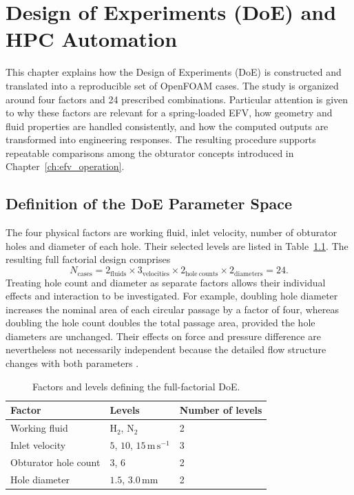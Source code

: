 \chapter{Design of Experiments (DoE) and HPC Automation}
\label{ch:doe}

This chapter explains how the Design of Experiments (DoE) is constructed and translated into a reproducible set of OpenFOAM cases. The study is organized around four factors and 24 prescribed combinations. Particular attention is given to why these factors are relevant for a spring-loaded EFV, how geometry and fluid properties are handled consistently, and how the computed outputs are transformed into engineering responses. The resulting procedure supports repeatable comparisons among the obturator concepts introduced in Chapter~\ref{ch:efv_operation}.

\section{Definition of the DoE Parameter Space}
\label{sec:doe_parameters}

The four physical factors are working fluid, inlet velocity, number of obturator holes and diameter of each hole. Their selected levels are listed in Table~\ref{tab:doe_factors}. The resulting full factorial design comprises
\begin{equation}
    N_{\mathrm{cases}}=2_{\mathrm{fluids}}\times3_{\mathrm{velocities}}\times
    2_{\mathrm{hole\ counts}}\times2_{\mathrm{diameters}}=24.
    \label{eq:doe_cases}
\end{equation}
Treating hole count and diameter as separate factors allows their individual effects and interaction to be investigated. For example, doubling hole diameter increases the nominal area of each circular passage by a factor of four, whereas doubling the hole count doubles the total passage area, provided the hole diameters are unchanged. Their effects on force and pressure difference are nevertheless not necessarily independent because the detailed flow structure changes with both parameters \cite{white2016,crane410}.

\begin{table}[htbp]
\centering
\begin{tabular}{@{}lll@{}}
\toprule
\textbf{Factor} & \textbf{Levels} & \textbf{Number of levels}\\
\midrule
Working fluid & $\mathrm{H}_2$, $\mathrm{N}_2$ & 2\\
Inlet velocity & $5$, $10$, $15\,\mathrm{m\,s^{-1}}$ & 3\\
Obturator hole count & 3, 6 & 2\\
Hole diameter & $1.5$, $3.0\,\mathrm{mm}$ & 2\\
\bottomrule
\end{tabular}
\caption{Factors and levels defining the full-factorial DoE.}
\label{tab:doe_factors}

\end{table}

